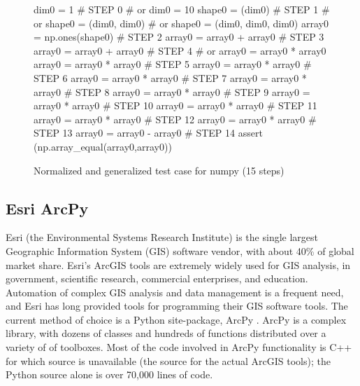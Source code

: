 \begin{figure}
{\scriptsize
\begin{code}
dim0 = 1                            \textcolor{black!45}{\# STEP 0}
\textcolor{black!45}{\#  or dim0 = 10 }
shape0 = (dim0)                     \textcolor{black!45}{\# STEP 1}
\textcolor{black!45}{\#  or shape0 = (dim0, dim0) }
\textcolor{black!45}{\#  or shape0 = (dim0, dim0, dim0) }
array0 = np.ones(shape0)            \textcolor{black!45}{\# STEP 2}
array0 = array0 + array0            \textcolor{black!45}{\# STEP 3}
array0 = array0 + array0            \textcolor{black!45}{\# STEP 4}
\textcolor{black!45}{\#  or array0 = array0 * array0 }
array0 = array0 * array0            \textcolor{black!45}{\# STEP 5}
array0 = array0 * array0            \textcolor{black!45}{\# STEP 6}
array0 = array0 * array0            \textcolor{black!45}{\# STEP 7}
array0 = array0 * array0            \textcolor{black!45}{\# STEP 8}
array0 = array0 * array0            \textcolor{black!45}{\# STEP 9}
array0 = array0 * array0            \textcolor{black!45}{\# STEP 10}
array0 = array0 * array0            \textcolor{black!45}{\# STEP 11}
array0 = array0 * array0            \textcolor{black!45}{\# STEP 12}
array0 = array0 * array0            \textcolor{black!45}{\# STEP 13}
array0 = array0 - array0            \textcolor{black!45}{\# STEP 14}
assert (np.array\_equal(array0,array0))
\end{code}
}
\caption{Normalized and generalized test case for numpy (15 steps)}
\label{numpynormgen}
\end{figure}

\subsection{Esri ArcPy}

Esri (the Environmental Systems Research Institute) is the single
largest Geographic Information System (GIS) software vendor, with about 40\%
of global market share.  Esri's ArcGIS tools are extremely widely
used for GIS analysis, in government, scientific research, commercial
enterprises, and education.  Automation of complex GIS analysis and
data management is a frequent need, and Esri has long provided tools
for programming their GIS software tools.  The current method of
choice is a Python site-package, ArcPy \cite{ArcPy}.  ArcPy is a complex library,
with dozens of classes and hundreds of functions distributed over
a variety of of toolboxes.  Most of the code involved in ArcPy
functionality is C++ for which source is unavailable (the source for
the actual ArcGIS tools); the Python source alone is over 70,000 lines
of code.

